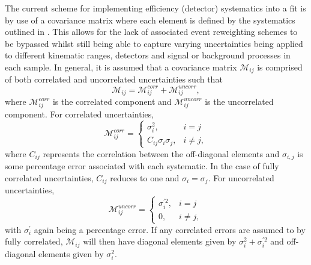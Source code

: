 The current scheme for implementing efficiency (detector) systematics into a fit is by use of a covariance matrix where each element is defined by the systematics outlined in  . This allows for the lack of associated event reweighting schemes to be bypassed whilst still being able to capture varying uncertainties being applied to different kinematic ranges, detectors and signal or background processes in each sample. In general, it is assumed that a covariance matrix $\mathcal{M}_{ij}$ is comprised of both correlated and uncorrelated uncertainties such that
\begin{equation}
    \mathcal{M}_{ij} = \mathcal{M}_{ij}^{corr} + \mathcal{M}_{ij}^{uncorr},
\end{equation}
where $\mathcal{M}_{ij}^{corr}$ is the correlated component and $\mathcal{M}_{ij}^{uncorr}$ is the uncorrelated component. For correlated uncertainties,
\begin{equation}
  \mathcal{M}_{ij}^{corr}=\begin{cases}
    \sigma_i^2, & \text{$i = j$}\\
    C_{ij} \sigma_i \sigma_j, & \text{$i \neq j$},
  \end{cases}
\end{equation}
where $C_{ij}$ represents the correlation between the off-diagonal elements and $\sigma_{i,j}$ is some percentage error associated with each systematic. In the case of fully correlated uncertainties, $C_{ij}$ reduces to one and $\sigma_i = \sigma_j$. For uncorrelated uncertainties,
\begin{equation}
  \mathcal{M}_{ij}^{uncorr}=\begin{cases}
    \sigma_i^{\prime2}, & \text{$i = j$}\\
    0, & \text{$i \neq j$},
  \end{cases}
\end{equation}
with $\sigma_i^{\prime}$ again being a percentage error. 
If any correlated errors are assumed to by fully correlated, $\mathcal{M}_{ij}$ will then have diagonal elements given by $\sigma_i^2 + \sigma_i^{\prime2}$ and off-diagonal elements given by $\sigma_i^2$.

